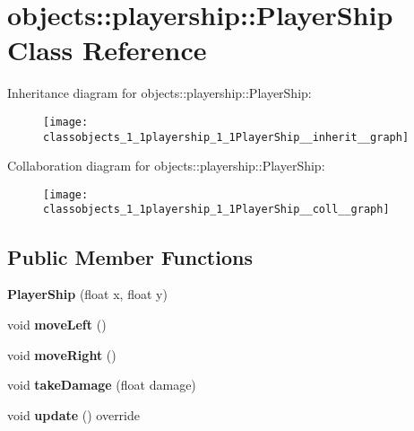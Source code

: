 \hypertarget{classobjects_1_1playership_1_1PlayerShip}{}\section{objects\+:\+:playership\+:\+:Player\+Ship Class Reference}
\label{classobjects_1_1playership_1_1PlayerShip}


Inheritance diagram for objects\+:\+:playership\+:\+:Player\+Ship\+:\nopagebreak
\begin{figure}[H]
\begin{center}
\leavevmode
\texttt{[image: classobjects\_1\_1playership\_1\_1PlayerShip\_\_inherit\_\_graph]}
\end{center}
\end{figure}


Collaboration diagram for objects\+:\+:playership\+:\+:Player\+Ship\+:\nopagebreak
\begin{figure}[H]
\begin{center}
\leavevmode
\texttt{[image: classobjects\_1\_1playership\_1\_1PlayerShip\_\_coll\_\_graph]}
\end{center}
\end{figure}
\subsection*{Public Member Functions}
\begin{DoxyCompactItemize}
\item 
\mbox{\label{classobjects_1_1playership_1_1PlayerShip_a17a64b5b78b9fa9c06601634d527ef77}}
{\bfseries Player\+Ship} (float x, float y)
\item 
\mbox{\label{classobjects_1_1playership_1_1PlayerShip_ae1855813ac0cfde9be1d9dfbf307f72e}}
void {\bfseries move\+Left} ()
\item 
\mbox{\label{classobjects_1_1playership_1_1PlayerShip_a9708f989ced14f082c36051e8a9710f7}}
void {\bfseries move\+Right} ()
\item 
\mbox{\label{classobjects_1_1playership_1_1PlayerShip_a0fdd05020563087b024831c93dad8ee1}}
void {\bfseries take\+Damage} (float damage)
\item 
\mbox{\label{classobjects_1_1playership_1_1PlayerShip_a618c1a8fd743a8fcbe9e60b44bd21dca}}
void {\bfseries update} () override
\end{DoxyCompactItemize}
